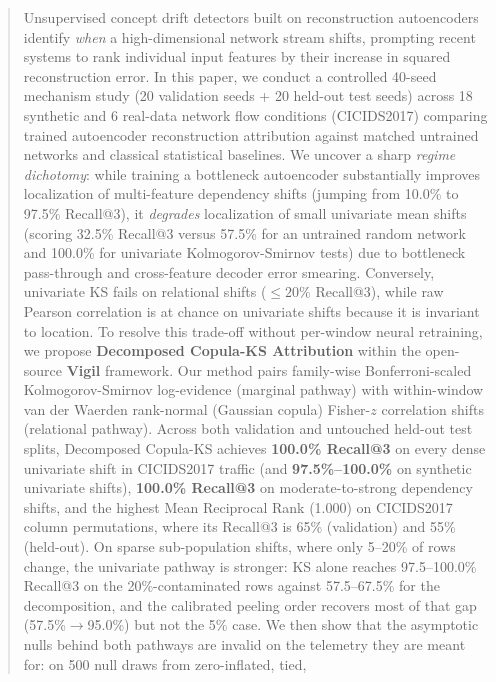\documentclass[10pt,conference]{IEEEtran}
\begin{document}
\begin{abstract}
Unsupervised concept drift detectors built on reconstruction autoencoders
identify \emph{when} a high-dimensional network stream shifts, prompting recent
systems to rank individual input features by their increase in squared
reconstruction error.
In this paper, we conduct a controlled 40-seed mechanism study (20 validation
seeds + 20 held-out test seeds) across 18 synthetic and 6 real-data network
flow conditions (CICIDS2017) comparing trained autoencoder reconstruction
attribution against matched untrained networks and classical statistical
baselines.
We uncover a sharp \emph{regime dichotomy}: while training a bottleneck
autoencoder substantially improves localization of multi-feature dependency
shifts (jumping from 10.0\% to 97.5\% Recall@3), it \emph{degrades}
localization of small univariate mean shifts (scoring 32.5\% Recall@3 versus
57.5\% for an untrained random network and 100.0\% for univariate
Kolmogorov-Smirnov tests) due to bottleneck pass-through and cross-feature
decoder error smearing.
Conversely, univariate KS fails on relational shifts ($\leq 20\%$ Recall@3),
while raw Pearson correlation is at chance on univariate shifts because it is
invariant to location.
To resolve this trade-off without per-window neural retraining, we propose
\textbf{Decomposed Copula-KS Attribution} within the open-source
\textbf{Vigil} framework.
Our method pairs family-wise Bonferroni-scaled Kolmogorov-Smirnov
log-evidence (marginal pathway) with within-window van der Waerden rank-normal
(Gaussian copula) Fisher-$z$ correlation shifts (relational pathway).
Across both validation and untouched held-out test splits, Decomposed Copula-KS
achieves \textbf{100.0\% Recall@3} on every dense univariate shift in CICIDS2017
traffic (and \textbf{97.5\%--100.0\%} on synthetic univariate shifts),
\textbf{100.0\% Recall@3} on moderate-to-strong dependency shifts, and the
highest Mean Reciprocal Rank (1.000) on CICIDS2017 column permutations, where
its Recall@3 is 65\% (validation) and 55\% (held-out).
On sparse sub-population shifts, where only 5--20\% of rows change, the
univariate pathway is stronger: KS alone reaches 97.5--100.0\% Recall@3 on the
20\%-contaminated rows against 57.5--67.5\% for the decomposition, and the
calibrated peeling order recovers most of that gap (57.5\%$\to$95.0\%) but not
the 5\% case.
We then show that the asymptotic nulls behind both pathways are invalid on the
telemetry they are meant for: on 500 null draws from zero-inflated, tied,

\end{abstract}
\end{document}
